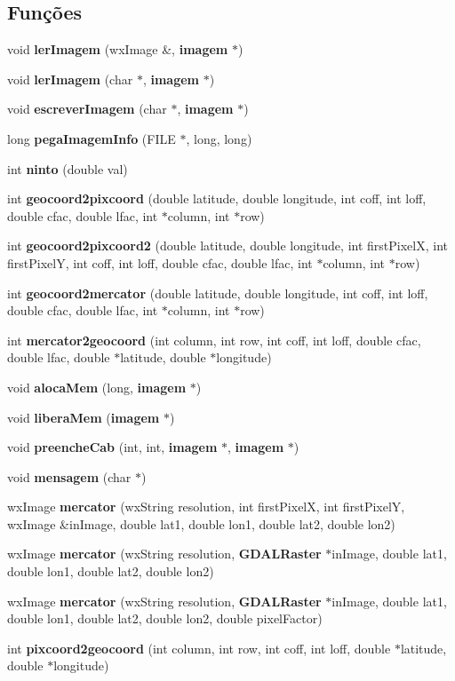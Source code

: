 \subsection*{Funções}
\begin{DoxyCompactItemize}
\item 
void {\bf ler\+Imagem} (wx\+Image \&, {\bf imagem} $\ast$)
\item 
void {\bf ler\+Imagem} (char $\ast$, {\bf imagem} $\ast$)
\item 
void {\bf escrever\+Imagem} (char $\ast$, {\bf imagem} $\ast$)
\item 
long {\bf pega\+Imagem\+Info} (F\+I\+LE $\ast$, long, long)
\item 
int {\bf ninto} (double val)
\item 
int {\bf geocoord2pixcoord} (double latitude, double longitude, int coff, int loff, double cfac, double lfac, int $\ast$column, int $\ast$row)
\item 
int {\bf geocoord2pixcoord2} (double latitude, double longitude, int first\+PixelX, int first\+PixelY, int coff, int loff, double cfac, double lfac, int $\ast$column, int $\ast$row)
\item 
int {\bf geocoord2mercator} (double latitude, double longitude, int coff, int loff, double cfac, double lfac, int $\ast$column, int $\ast$row)
\item 
int {\bf mercator2geocoord} (int column, int row, int coff, int loff, double cfac, double lfac, double $\ast$latitude, double $\ast$longitude)
\item 
void {\bf aloca\+Mem} (long, {\bf imagem} $\ast$)
\item 
void {\bf libera\+Mem} ({\bf imagem} $\ast$)
\item 
void {\bf preenche\+Cab} (int, int, {\bf imagem} $\ast$, {\bf imagem} $\ast$)
\item 
void {\bf mensagem} (char $\ast$)
\item 
wx\+Image {\bf mercator} (wx\+String resolution, int first\+PixelX, int first\+PixelY, wx\+Image \&in\+Image, double lat1, double lon1, double lat2, double lon2)
\item 
wx\+Image {\bf mercator} (wx\+String resolution, {\bf G\+D\+A\+L\+Raster} $\ast$in\+Image, double lat1, double lon1, double lat2, double lon2)
\item 
wx\+Image {\bf mercator} (wx\+String resolution, {\bf G\+D\+A\+L\+Raster} $\ast$in\+Image, double lat1, double lon1, double lat2, double lon2, double pixel\+Factor)
\item 
int {\bf pixcoord2geocoord} (int column, int row, int coff, int loff, double $\ast$latitude, double $\ast$longitude)
\end{DoxyCompactItemize}


